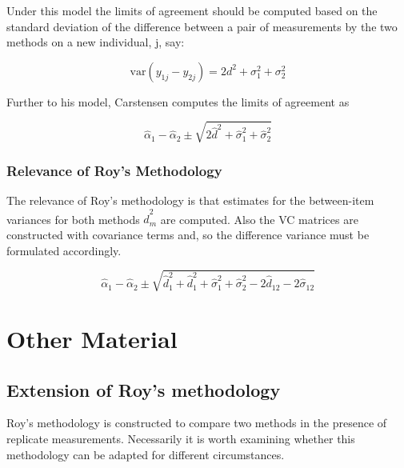\documentclass[12pt, a4paper]{report}
\theoremstyle{plain}
\theoremstyle{definition}
\theoremstyle{remark}
\begin{document}
	
	Under this model the limits of agreement should be computed based
	on the standard deviation of the difference between a pair of
	measurements by the two methods on a new individual, j, say:
	
	\[ \mbox{var}(y_{1j} - y_{2j}) = 2d^2 + \sigma^2_1 + \sigma^2_2  \]
	
	Further to his model, Carstensen computes the limits of agreement
	as
	
	\[
	\hat{\alpha}_1 - \hat{\alpha}_2 \pm \sqrt{2 \hat{d}^2 + 	\hat{\sigma}^2_1 + \hat{\sigma}^2_2}
	\]
	
	
	
	
	
	

\subsection{Relevance of Roy's Methodology}

The relevance of Roy's methodology is that estimates for the between-item variances for both methods $\hat{d}^2_m$ are computed. Also the VC matrices are constructed with covariance
terms and, so the difference variance must be formulated accordingly.


\[
\hat{\alpha}_1 - \hat{\alpha}_2 \pm \sqrt{ \hat{d}^2_1  +
	\hat{d}^2_1 + \hat{\sigma}^2_1 + \hat{\sigma}^2_2 - 2 \hat{d}_{12}
	- 2 \hat{\sigma}_12}
\]








%


\newpage

\chapter{Other Material}
\section{Extension of Roy's methodology}
Roy's methodology is constructed to compare two methods in the presence of replicate measurements. Necessarily it is worth examining whether this methodology can be adapted for different circumstances.
\end{document}
